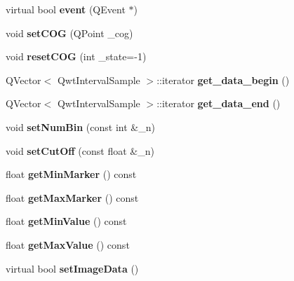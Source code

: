 \begin{DoxyCompactItemize}
virtual bool {\bfseries event} (Q\+Event $\ast$)
\item 
\mbox{\label{classBarScreenWL_a6fe94b0eae1c5fb513837b7cf424b67f}} 
void {\bfseries set\+C\+OG} (Q\+Point \+\_\+cog)
\item 
\mbox{\label{classBarScreenWL_af1d50a882140b7dbfe27aaa08f54e903}} 
void {\bfseries reset\+C\+OG} (int \+\_\+state=-\/1)
\item 
\mbox{\label{classBarScreen_a1950f3ff2fcb6f9c815480d79c41bcdd}} 
Q\+Vector$<$ Qwt\+Interval\+Sample $>$\+::iterator {\bfseries get\+\_\+data\+\_\+begin} ()
\item 
\mbox{\label{classBarScreen_a8b4c985476a91cfbaba65f9efb2fb98d}} 
Q\+Vector$<$ Qwt\+Interval\+Sample $>$\+::iterator {\bfseries get\+\_\+data\+\_\+end} ()
\item 
\mbox{\label{classBarScreen_aa39400dbc0e698031f526a5696c5f05e}} 
void {\bfseries set\+Num\+Bin} (const int \&\+\_\+n)
\item 
\mbox{\label{classBarScreen_a31a0a0513a3506fd31b4921d9ef9de5f}} 
void {\bfseries set\+Cut\+Off} (const float \&\+\_\+n)
\item 
\mbox{\label{classBarScreen_a3619df2d1013dcd882836654bdc7eca8}} 
float {\bfseries get\+Min\+Marker} () const
\item 
\mbox{\label{classBarScreen_a8c31c0657a9eae009fae26a6095527af}} 
float {\bfseries get\+Max\+Marker} () const
\item 
\mbox{\label{classBarScreen_a8b1fd79efa17f74f838604cf28e82497}} 
float {\bfseries get\+Min\+Value} () const
\item 
\mbox{\label{classBarScreen_a6621f8fa1c402d63dd9ac1a29002eb38}} 
float {\bfseries get\+Max\+Value} () const
\item 
\mbox{\label{classBarScreen_ab9e1489e0b5d95f26fd7a00763e91d11}} 
virtual bool {\bfseries set\+Image\+Data} ()
\item 

\end{DoxyCompactItemize}
